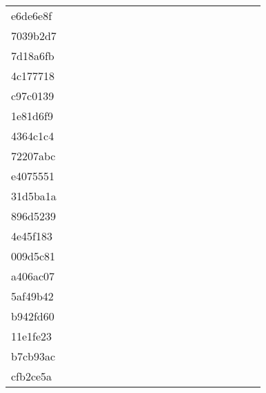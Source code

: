 \begin{table*}[htb]
\begin{tabular}{l|cccccccccccccccccc}
e6de6e8f  & \C & \X & \X & \X & \X & \X & \X & \X & \X & \X & \X & \X & \X & \C & \C & \X & \X \\
7039b2d7  & \C & \X & \X & \X & \X & \X & \X & \C & \C & \X & \X & \C & \C & \C & \C & \X & \X \\
7d18a6fb  & \C & \X & \X & \X & \X & \X & \X & \X & \X & \X & \X & \X & \X & \C & \C & \X & \X \\
4c177718  & \C & \X & \X & \X & \X & \X & \X & \X & \X & \X & \X & \X & \X & \C & \C & \C & \X \\
c97c0139  & \C & \X & \X & \X & \X & \X & \X & \X & \X & \X & \X & \X & \X & \C & \C & \X & \X \\
1e81d6f9  & \C & \X & \X & \X & \X & \X & \X & \X & \X & \X & \X & \C & \C & \C & \C & \C & \C \\
4364c1c4  & \C & \X & \X & \X & \X & \X & \X & \X & \X & \X & \X & \C & \C & \C & \C & \C & \C \\
72207abc  & \C & \X & \X & \C & \X & \C & \C & \C & \X & \C & \C & \C & \C & \C & \C & \X & \C \\
e4075551  & \C & \X & \X & \X & \X & \X & \X & \X & \X & \X & \X & \C & \C & \C & \C & \C & \C \\
31d5ba1a  & \C & \X & \X & \X & \X & \X & \X & \C & \C & \C & \C & \C & \C & \C & \C & \C & \C \\
896d5239  & \X & \X & \X & \X & \X & \X & \X & \X & \X & \X & \X & \X & \X & \X & \X & \X & \X \\
4e45f183  & \C & \X & \X & \X & \X & \X & \X & \X & \X & \X & \X & \X & \X & \C & \C & \X & \X \\
009d5c81  & \C & \X & \C & \X & \X & \C & \X & \X & \C & \X & \X & \C & \C & \C & \C & \X & \X \\
a406ac07  & \C & \X & \X & \X & \X & \C & \X & \X & \C & \C & \C & \C & \C & \C & \C & \C & \C \\
5af49b42  & \C & \X & \X & \X & \X & \X & \X & \X & \X & \X & \X & \X & \X & \C & \C & \X & \X \\
b942fd60  & \C & \X & \X & \X & \X & \X & \X & \X & \X & \X & \X & \X & \X & \X & \C & \X & \X \\
11e1fe23  & \C & \X & \X & \X & \X & \X & \X & \X & \X & \X & \X & \X & \X & \C & \C & \X & \X \\
b7cb93ac  & \C & \X & \X & \X & \X & \X & \X & \X & \X & \X & \X & \X & \X & \C & \C & \X & \C \\
cfb2ce5a  & \C & \X & \X & \X & \X & \X & \X & \X & \X & \X & \X & \X & \X & \C & \C & \X & \X \\

\end{tabular}
\end{table*}
